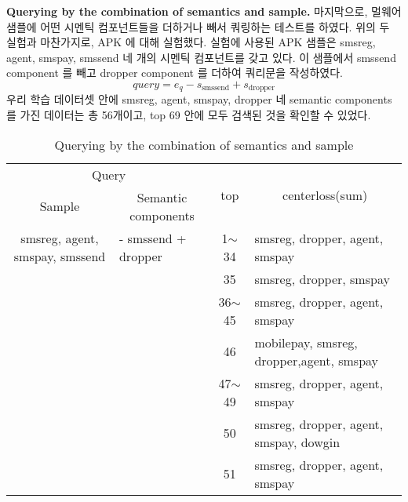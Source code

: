 \textbf{Querying by the combination of semantics and sample. }
마지막으로, 멀웨어 샘플에 어떤 시멘틱 컴포넌트들을 더하거나 빼서 쿼링하는 테스트를 하였다. 위의 두 실험과 마찬가지로, APK 에 대해 실험했다. 실험에 사용된 APK 샘플은 smsreg, agent, smspay, smssend 네 개의 시멘틱 컴포넌트를 갖고 있다. 이 샘플에서 smssend component 를 빼고 dropper component 를 더하여 쿼리문을 작성하였다. 
\[
   query = e_q - s_{\text{smssend}} + s_{\text{dropper}} 
\]
우리 학습 데이터셋 안에 smsreg, agent, smspay, dropper 네 semantic components 를 가진 데이터는 총 56개이고, top 69 안에 모두 검색된 것을 확인할 수 있었다. 
\begin{table*}%
\caption{Querying by the combination of semantics and sample}
\label{tab:sample_and_semantics_query_result}
\begin{minipage}{\textwidth}
\begin{center}
\begin{tabular}{llcl}
\hline
\multicolumn{2}{c}{Query}                                                                    & \multirow{2}{*}{top} & \multicolumn{1}{c}{\multirow{2}{*}{centerloss(sum)}} \\
\multicolumn{1}{c}{Sample}                         & \multicolumn{1}{c}{Semantic components} &                      & \multicolumn{1}{c}{}                                 \\ \hline
\multicolumn{1}{c}{smsreg, agent, smspay, smssend} & - smssend + dropper                     & 1$\sim$34            & smsreg, dropper, agent, smspay                       \\
                                                   &                                         & 35                   & smsreg, dropper, smspay                              \\
                                                   &                                         & 36$\sim$45           & smsreg, dropper, agent, smspay                       \\
                                                   &                                         & 46                   & mobilepay, smsreg, dropper,agent, smspay             \\
                                                   &                                         & 47$\sim$49           & smsreg, dropper, agent, smspay                       \\
                                                   &                                         & 50                   & smsreg, dropper, agent, smspay, dowgin               \\
                                                   &                                         & 51                   & smsreg, dropper, agent, smspay                       \\ \hline
\end{tabular}
\end{center}
\bigskip\centering
\end{minipage}
\end{table*}%

